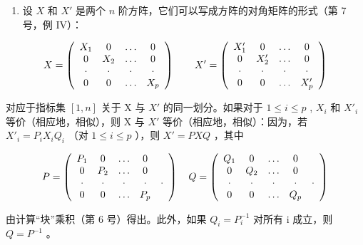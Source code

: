\begin{enumerate}
\def\labelenumi{(\arabic{enumi})}
\setcounter{enumi}{1}
\tightlist
\item
  设 \(X\) 和 \(X'\) 是两个 \(n\) 阶方阵，它们可以写成方阵的对角矩阵的形式（第 7 号，例 IV）：
\end{enumerate}

\[
X = \left( \begin{array}{c c c c} X _ {1} & 0 & \ldots & 0 \\ 0 & X _ {2} & \ldots & 0 \\ \cdot & \cdot & \cdot & \cdot \\ 0 & 0 & \ldots & X _ {p} \end{array} \right) \qquad X ^ {\prime} = \left( \begin{array}{c c c c} X _ {1} ^ {\prime} & 0 & \ldots & 0 \\ 0 & X _ {2} ^ {\prime} & \ldots & 0 \\ \cdot & \cdot & \cdot & \cdot \\ 0 & 0 & \ldots & X _ {p} ^ {\prime} \end{array} \right)
\]

对应于指标集 \([1, n]\) 关于 X 与 \(X'\) 的同一划分。如果对于 \(1 \leqslant i \leqslant p\) , \(X_i\) 和 \(X'_i\) 等价（相应地，相似），则 X 与 \(X'\) 等价（相应地，相似）：因为，若 \(X'_i = P_i X_i Q_i\) （对 \(1 \leqslant i \leqslant p\) ），则 \(X' = PXQ\) ，其中

\[
P = \left( \begin{array}{c c c c c} P _ {1} & 0 & \dots & 0 \\ 0 & P _ {2} & \dots & 0 \\ \cdot & \cdot & \cdot & \cdot & \cdot \\ 0 & 0 & \dots & P _ {p} \end{array} \right) \quad Q = \left( \begin{array}{c c c c c} Q _ {1} & 0 & \dots & 0 \\ 0 & Q _ {2} & \dots & 0 \\ \cdot & \cdot & \cdot & \cdot & \cdot \\ 0 & 0 & \dots & Q _ {p} \end{array} \right)
\]

由计算“块”乘积（第 6 号）得出。此外，如果 \(Q_{i} = P_{i}^{-1}\) 对所有 i 成立，则 \(Q = P^{-1}\) 。

